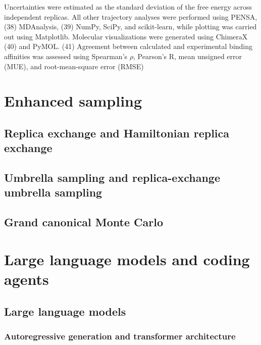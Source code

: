 Uncertainties were estimated as the standard deviation of the free energy across independent replicas. All other trajectory analyses were performed using PENSA, (38) MDAnalysis, (39) NumPy, SciPy, and scikit-learn, while plotting was carried out using Matplotlib. Molecular visualizations were generated using ChimeraX (40) and PyMOL. (41) Agreement between calculated and experimental binding affinities was assessed using Spearman's $\rho$, Pearson's R, mean unsigned error (MUE), and root-mean-square error (RMSE)


\section{Enhanced sampling}

\lipsum[1][1-3]

\subsection{Replica exchange and Hamiltonian replica exchange}

\lipsum[1][1-3]

\subsection{Umbrella sampling and replica-exchange umbrella sampling}

\lipsum[1][1-3]

\subsection{Grand canonical Monte Carlo} %

\lipsum[1][1-3]

\section{Large language models and coding agents}

\lipsum[1][1-3]

\subsection{Large language models}

\lipsum[1][1-3]

\subsubsection{Autoregressive generation and transformer architecture}

